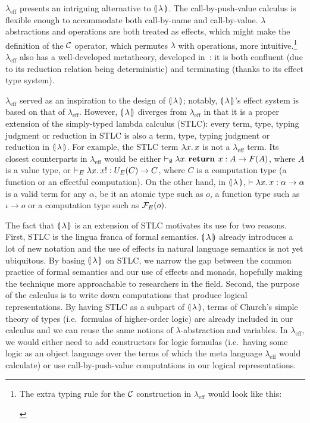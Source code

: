 \begin{itemize}
  $\lambda_{\mathrm{eff}}$ presents an intriguing alternative to
  $\calc$. The call-by-push-value calculus is flexible enough to
  accommodate both call-by-name and call-by-value. $\lambda$ abstractions
  and operations are both treated as effects, which might make the
  definition of the $\CC$ operator, which permutes $\lambda$ with
  operations, more intuitive.\footnote{The extra typing rule for the $\CC$
    construction in $\lambda_{\mathrm{eff}}$ would look like this:
    \begin{prooftree}
    \end{prooftree}} $\lambda_{\mathrm{eff}}$ also has a well-developed
  metatheory, developed in~\cite{kammar2013handlers}: it is both confluent
  (due to its reduction relation being deterministic) and terminating
  (thanks to its effect type system).

  $\lambda_{\mathrm{eff}}$ served as an inspiration to the design of
  $\calc$; notably, $\calc$'s effect system is based on that of
  $\lambda_{\mathrm{eff}}$. However, $\calc$ diverges from
  $\lambda_{\mathrm{eff}}$ in that it is a proper extension of the
  simply-typed lambda calculus (STLC): every term, type, typing judgment or
  reduction in STLC is also a term, type, typing judgment or reduction in
  $\calc$. For example, the STLC term $\lam{x}{x}$ is not a
  $\lambda_{\mathrm{eff}}$ term. Its closest counterparts in
  $\lambda_{\mathrm{eff}}$ would be either
  $\vdash_\emptyset \lam{x}{\textbf{return } x} : A \to F(A)$, where $A$ is
  a value type, or $\vdash_E \lam{x}{x!} : U_E(C) \to C$, where $C$ is a
  computation type (a function or an effectful computation). On the other
  hand, in $\calc$, $\vdash \lam{x}{x} : \alpha \to \alpha$ is a valid term
  for any $\alpha$, be it an atomic type such as $o$, a function type such
  as $\iota \to o$ or a computation type such as $\FF_E(o)$.

  The fact that $\calc$ is an extension of STLC motivates its use for two
  reasons. First, STLC is the lingua franca of formal semantics. $\calc$
  already introduces a lot of new notation and the use of effects in
  natural language semantics is not yet ubiquitous. By basing $\calc$ on
  STLC, we narrow the gap between the common practice of formal semantics
  and our use of effects and monads, hopefully making the technique more
  approachable to researchers in the field. Second, the purpose of the
  calculus is to write down computations that produce logical
  representations. By having STLC as a subpart of $\calc$, terms of
  Church's simple theory of types (i.e.\ formulas of higher-order logic)
  are already included in our calculus and we can reuse the same notions of
  $\lambda$-abstraction and variables. In $\lambda_{\mathrm{eff}}$, we
  would either need to add constructors for logic formulas (i.e.\ having
  some logic as an object language over the terms of which the meta
  language $\lambda_{\mathrm{eff}}$ would calculate) or use
  call-by-push-value computations in our logical representations.


\end{itemize}
